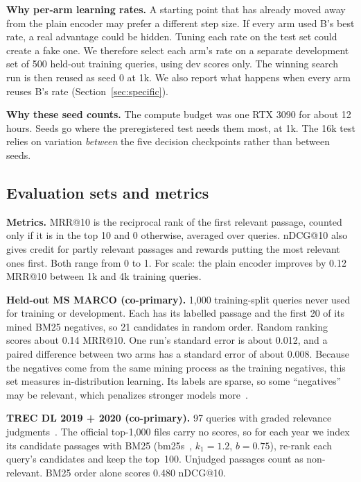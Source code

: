 \documentclass[journal]{IEEEtran}
\makeatletter
\newcommand{\ms}{MRR@10}
\newcommand{\nd}{nDCG@10}
\makeatother
\begin{document}
\textbf{Why per-arm learning rates.} A starting point that has already moved away from the plain encoder may prefer a different step size. If every arm used B's best rate, a real advantage could be hidden. Tuning each rate on the test set could create a fake one. We therefore select each arm's rate on a separate development set of 500 held-out training queries, using dev scores only. The winning search run is then reused as seed 0 at 1k. We also report what happens when every arm reuses B's rate (Section~\ref{sec:specific}).

\textbf{Why these seed counts.} The compute budget was one RTX 3090 for about 12 hours. Seeds go where the preregistered test needs them most, at 1k. The 16k test relies on variation \emph{between} the five decision checkpoints rather than between seeds.

\subsection{Evaluation sets and metrics}

\textbf{Metrics.} \ms{} is the reciprocal rank of the first relevant passage, counted only if it is in the top 10 and 0 otherwise, averaged over queries. \nd{} also gives credit for partly relevant passages and rewards putting the most relevant ones first. Both range from 0 to 1. For scale: the plain encoder improves by 0.12 \ms{} between 1k and 4k training queries.

\textbf{Held-out MS MARCO (co-primary).} 1{,}000 training-split queries never used for training or development. Each has its labelled passage and the first 20 of its mined BM25 negatives, so 21 candidates in random order. Random ranking scores about 0.14 \ms{}. One run's standard error is about 0.012, and a paired difference between two arms has a standard error of about 0.008. Because the negatives come from the same mining process as the training negatives, this set measures in-distribution learning. Its labels are sparse, so some ``negatives'' may be relevant, which penalizes stronger models more~\cite{arabzadeh2022shallow}.

\textbf{TREC DL 2019 + 2020 (co-primary).} 97 queries with graded relevance judgments~\cite{craswell2020dl19,craswell2021dl20}. The official top-1{,}000 files carry no scores, so for each year we index its candidate passages with BM25 (bm25s~\cite{lu2024bm25s}, $k_1=1.2$, $b=0.75$), re-rank each query's candidates and keep the top~100. Unjudged passages count as non-relevant. BM25 order alone scores 0.480 \nd{}.
\end{document}
